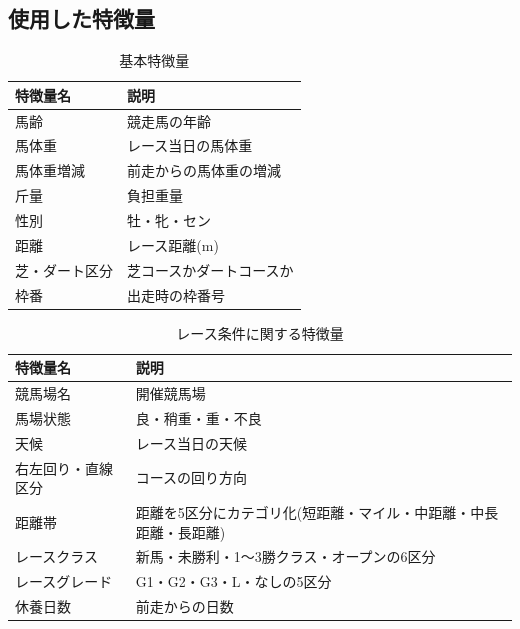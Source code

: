 \documentclass[dvipdfmx, a4paper, 11pt, titlepage]{jsarticle}
\begin{document}
\subsection{使用した特徴量}
\begin{table}[H]
  \centering
  \caption{基本特徴量}
  \label{tab:basic_features}
  \begin{tabular}{ll}
    \hline
    特徴量名 & 説明 \\
    \hline
    馬齢 & 競走馬の年齢 \\
    馬体重 & レース当日の馬体重 \\
    馬体重増減 & 前走からの馬体重の増減 \\
    斤量 & 負担重量 \\
    性別 & 牡・牝・セン \\
    距離 & レース距離(m) \\
    芝・ダート区分 & 芝コースかダートコースか \\
    枠番 & 出走時の枠番号 \\
    \hline
  \end{tabular}
\end{table}

\begin{table}[H]
  \centering
  \caption{レース条件に関する特徴量}
  \label{tab:race_condition_features}
  \begin{tabular}{ll}
    \hline
    特徴量名 & 説明 \\
    \hline
    競馬場名 & 開催競馬場 \\
    馬場状態 & 良・稍重・重・不良 \\
    天候 & レース当日の天候 \\
    右左回り・直線区分 & コースの回り方向 \\
    距離帯 & 距離を5区分にカテゴリ化(短距離・マイル・中距離・中長距離・長距離) \\
    レースクラス & 新馬・未勝利・1〜3勝クラス・オープンの6区分 \\
    レースグレード & G1・G2・G3・L・なしの5区分 \\
    休養日数 & 前走からの日数 \\
    \hline
  \end{tabular}
\end{table}
\end{document}
